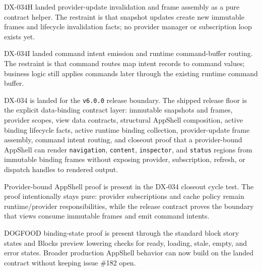 DX-034H landed provider-update invalidation and frame assembly as a pure contract helper. The restraint is that snapshot updates create new immutable frames and lifecycle invalidation facts; no provider manager or subscription loop exists yet.

DX-034I landed command intent emission and runtime command-buffer routing. The restraint is that command routes map intent records to command values; business logic still applies commands later through the existing runtime command buffer.

DX-034 is landed for the \texttt{v\allowbreak{}6\allowbreak{}.\allowbreak{}0\allowbreak{}.\allowbreak{}0} release boundary. The shipped release floor is the explicit data-binding contract layer: immutable snapshots and frames, provider scopes, view data contracts, structural AppShell composition, active binding lifecycle facts, active runtime binding collection, provider-update frame assembly, command intent routing, and closeout proof that a provider-bound AppShell can render \texttt{n\allowbreak{}a\allowbreak{}v\allowbreak{}i\allowbreak{}g\allowbreak{}a\allowbreak{}t\allowbreak{}i\allowbreak{}o\allowbreak{}n}, \texttt{c\allowbreak{}o\allowbreak{}n\allowbreak{}t\allowbreak{}e\allowbreak{}n\allowbreak{}t}, \texttt{i\allowbreak{}n\allowbreak{}s\allowbreak{}p\allowbreak{}e\allowbreak{}c\allowbreak{}t\allowbreak{}o\allowbreak{}r}, and \texttt{s\allowbreak{}t\allowbreak{}a\allowbreak{}t\allowbreak{}u\allowbreak{}s} regions from immutable binding frames without exposing provider, subscription, refresh, or dispatch handles to rendered output.

Provider-bound AppShell proof is present in the DX-034 closeout cycle test. The proof intentionally stays pure: provider subscriptions and cache policy remain runtime/provider responsibilities, while the release contract proves the boundary that views consume immutable frames and emit command intents.

DOGFOOD binding-state proof is present through the standard block story states and Blocks preview lowering checks for ready, loading, stale, empty, and error states. Broader production AppShell behavior can now build on the landed contract without keeping issue \#182 open.

